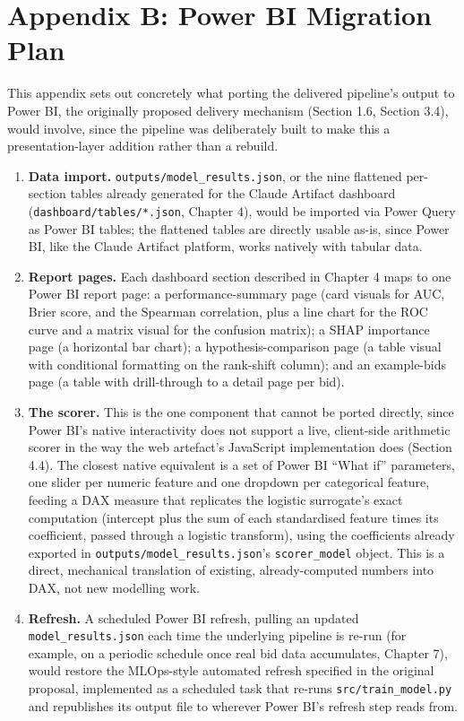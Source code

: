 \hypertarget{appendix-b-power-bi-migration-plan}{%
\section*{Appendix B: Power BI Migration
Plan}\label{appendix-b-power-bi-migration-plan}}

This appendix sets out concretely what porting the delivered pipeline's
output to Power BI, the originally proposed delivery mechanism (Section
1.6, Section 3.4), would involve, since the pipeline was deliberately
built to make this a presentation-layer addition rather than a rebuild.

\begin{enumerate}
\def\labelenumi{\arabic{enumi}.}
\tightlist
\item
  \textbf{Data import.} \texttt{outputs/model\_results.json}, or the
  nine flattened per-section tables already generated for the Claude
  Artifact dashboard (\texttt{dashboard/tables/*.json}, Chapter 4),
  would be imported via Power Query as Power BI tables; the flattened
  tables are directly usable as-is, since Power BI, like the Claude
  Artifact platform, works natively with tabular data.
\item
  \textbf{Report pages.} Each dashboard section described in Chapter 4
  maps to one Power BI report page: a performance-summary page (card
  visuals for AUC, Brier score, and the Spearman correlation, plus a
  line chart for the ROC curve and a matrix visual for the confusion
  matrix); a SHAP importance page (a horizontal bar chart); a
  hypothesis-comparison page (a table visual with conditional formatting
  on the rank-shift column); and an example-bids page (a table with
  drill-through to a detail page per bid).
\item
  \textbf{The scorer.} This is the one component that cannot be ported
  directly, since Power BI's native interactivity does not support a
  live, client-side arithmetic scorer in the way the web artefact's
  JavaScript implementation does (Section 4.4). The closest native
  equivalent is a set of Power BI ``What if'' parameters, one slider per
  numeric feature and one dropdown per categorical feature, feeding a
  DAX measure that replicates the logistic surrogate's exact computation
  (intercept plus the sum of each standardised feature times its
  coefficient, passed through a logistic transform), using the
  coefficients already exported in
  \texttt{outputs/model\_results.json}'s \texttt{scorer\_model} object.
  This is a direct, mechanical translation of existing, already-computed
  numbers into DAX, not new modelling work.
\item
  \textbf{Refresh.} A scheduled Power BI refresh, pulling an updated
  \texttt{model\_results.json} each time the underlying pipeline is
  re-run (for example, on a periodic schedule once real bid data
  accumulates, Chapter 7), would restore the MLOps-style automated
  refresh specified in the original proposal, implemented as a scheduled
  task that re-runs \texttt{src/train\_model.py} and republishes its
  output file to wherever Power BI's refresh step reads from.
\end{enumerate}

